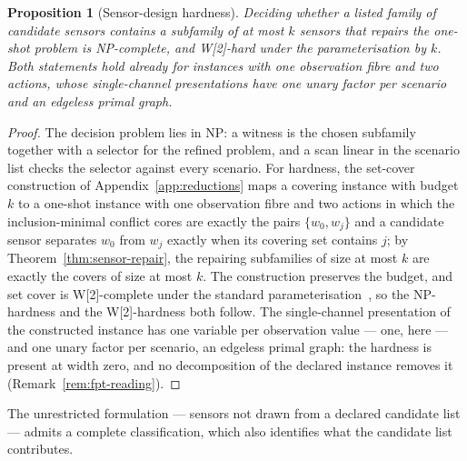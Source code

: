 \documentclass[11pt]{article}
\theoremstyle{plain}
\newtheorem{proposition}[theorem]{Proposition}
\theoremstyle{definition}
\theoremstyle{remark}
\begin{document}
\begin{proposition}[Sensor-design hardness]
\label{prop:sensor-design-hardness}
Deciding whether a listed family of candidate sensors contains a subfamily of
at most \(k\) sensors that repairs the one-shot problem is NP-complete, and
W[2]-hard under the parameterisation by \(k\).  Both statements hold already
for instances with one observation fibre and two actions, whose single-channel
presentations have one unary factor per scenario and an edgeless primal graph.
\end{proposition}

\begin{proof}
The decision problem lies in NP: a witness is the chosen subfamily together
with a selector for the refined problem, and a scan linear in the scenario
list checks the selector against every scenario.  For hardness, the set-cover
construction of Appendix~\ref{app:reductions} maps a covering instance with
budget \(k\) to a one-shot instance with one observation fibre and two
actions in which the inclusion-minimal conflict cores are exactly the pairs
\(\{w_0,w_j\}\) and a candidate sensor separates \(w_0\) from \(w_j\)
exactly when its covering set contains \(j\); by
Theorem~\ref{thm:sensor-repair}, the repairing subfamilies of size at most
\(k\) are exactly the covers of size at most \(k\).  The construction
preserves the budget, and set cover is W[2]-complete under the standard
parameterisation~\cite{downey-fellows99}, so the NP-hardness and the
W[2]-hardness both follow.  The single-channel presentation of the
constructed instance has one variable per observation value --- one, here ---
and one unary factor per scenario, an edgeless primal graph: the hardness is
present at width zero, and no decomposition of the declared instance removes
it (Remark~\ref{rem:fpt-reading}).
\end{proof}

The unrestricted formulation --- sensors not drawn from a declared candidate
list --- admits a complete classification, which also identifies what the
candidate list contributes.
\end{document}
